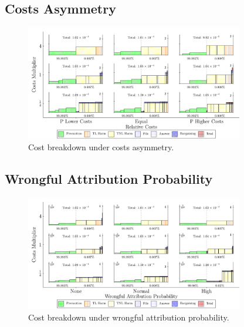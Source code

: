 \documentclass{article}
\begin{document}
\subsection{Costs Asymmetry}
\begin{figure}[ht]
  \centering
  \includegraphics[width=0.85\textwidth]{../Figures/Cost Breakdown Relative Costs (All Rows).pdf}
  \caption{Cost breakdown under costs asymmetry.}
  \label{fig:costs_asymmetry}
\end{figure}

\FloatBarrier
\subsection{Wrongful Attribution Probability}
\begin{figure}[ht]
  \centering
  \includegraphics[width=0.85\textwidth]{../Figures/Cost Breakdown Wrongful Attribution Probability (All Rows).pdf}
  \caption{Cost breakdown under wrongful attribution probability.}
  \label{fig:wrongful_attr}
\end{figure}

\FloatBarrier
\end{document}
